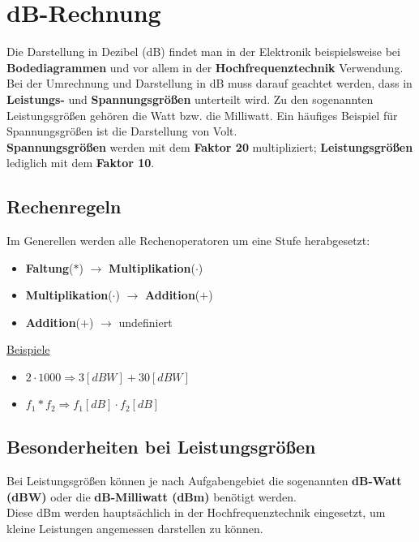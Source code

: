 \chapter{dB-Rechnung}
Die Darstellung in Dezibel (dB) findet man in der Elektronik beispielsweise bei \textbf{Bodediagrammen} und vor allem in der \textbf{Hochfrequenztechnik} Verwendung. 
Bei der Umrechnung und Darstellung in dB muss darauf geachtet werden, dass in \textbf{Leistungs-} und \textbf{Spannungsgrößen} unterteilt wird. Zu den sogenannten Leistungsgrößen gehören die Watt bzw. die Milliwatt. Ein häufiges Beispiel für Spannungsgrößen ist die Darstellung von Volt.\\

\textbf{Spannungsgrößen} werden mit dem \textbf{Faktor 20} multipliziert; \textbf{Leistungsgrößen} lediglich mit dem \textbf{Faktor 10}.

\section{Rechenregeln}
Im Generellen werden alle Rechenoperatoren um eine Stufe herabgesetzt:

\begin{itemize}
    \item \textbf{Faltung}($*$) $\rightarrow$ \textbf{Multiplikation}($\cdot$)
    \item \textbf{Multiplikation}($\cdot$) $\rightarrow$ \textbf{Addition}($+$)
    \item \textbf{Addition}($+$) $\rightarrow$ undefiniert
\end{itemize}

\underline{Beispiele}
\begin{itemize}
    \item $2\cdot 1000\Rightarrow 3[dBW]+30[dBW]$
    \item $f_1 * f_2 \Rightarrow f_1[dB]\cdot f_2[dB]$
\end{itemize}

\section{Besonderheiten bei Leistungsgrößen}
Bei Leistungsgrößen können je nach Aufgabengebiet die sogenannten \textbf{dB-Watt (dBW)} oder die \textbf{dB-Milliwatt (dBm)} benötigt werden.\\
Diese dBm werden hauptsächlich in der Hochfrequenztechnik eingesetzt, um kleine Leistungen angemessen darstellen zu können.\\

